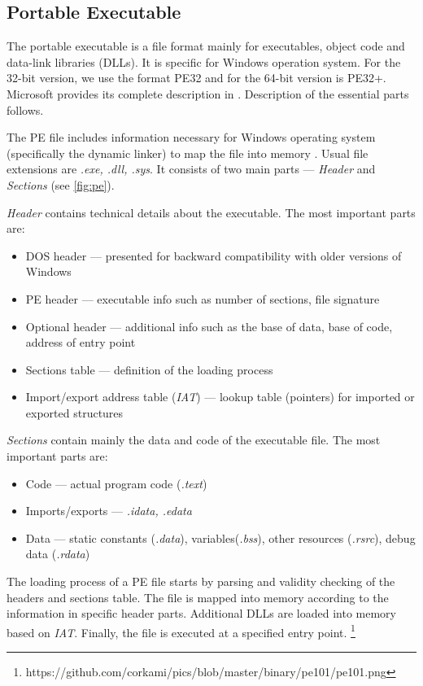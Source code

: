 \subsection{Portable Executable}
The portable executable is a file format mainly for executables, object code and data-link libraries (DLLs). It is specific for Windows operation system. For the 32-bit version, we use the format PE32 and for the 64-bit version is PE32+. Microsoft provides its complete description in \cite{PEFormat89:online}. Description of the essential parts follows.

The PE file includes information necessary for Windows operating system (specifically the dynamic linker) to map the file into memory \cite{Gibert2020}. Usual file extensions are \emph{.exe, .dll, .sys}. It consists of two main parts --- \emph{Header} and \emph{Sections} (see \ref{fig:pe}). 

\emph{Header} contains technical details about the executable. The most important parts are:
\begin{itemize}
  \itemsep0em 
  \item DOS header --- presented for backward compatibility with older versions of Windows
  \item PE header --- executable info such as number of sections, file signature
  \item Optional header --- additional info such as the base of data, base of code, address of entry point
  \item Sections table --- definition of the loading process
  \item Import/export address table (\emph{IAT}) --- lookup table (pointers) for imported or exported structures
\end{itemize}

\emph{Sections} contain mainly the data and code of the executable file. The most important parts are:
\begin{itemize}
  \itemsep0em 
  \item Code --- actual program code (\emph{.text})
  \item Imports/exports --- \emph{.idata, .edata}
  \item Data --- static constants (\emph{.data}), variables(\emph{.bss}), other resources (\emph{.rsrc}), debug data (\emph{.rdata})
\end{itemize}

The loading process of a PE file starts by parsing and validity checking of the headers and sections table. The file is mapped into memory according to the information in specific header parts. Additional DLLs are loaded into memory based on \emph{IAT}. Finally, the file is executed at a specified entry point. \footnote{https://github.com/corkami/pics/blob/master/binary/pe101/pe101.png}

